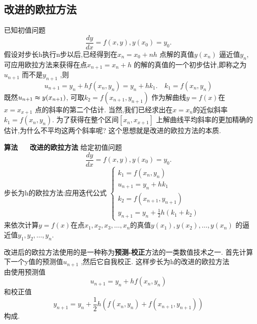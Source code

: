 \documentclass{book}
\begin{document}
\subsection{改进的欧拉方法}
已知初值问题
\begin{equation}
  \frac{dy}{dx}=f(x,y),y(x_0)=y_0.
\end{equation}
假设对步长h执行n步以后,已经得到在$x_n=x_0+nh$ 点解的真值$y(x_n)$ 逼近值$y_n$, 可应用欧拉方法来获得在点$x_{n+1}=x_n+h$ 的解的真值的一个初步估计,即称之为$u_{n+1}$ 而不是$y_{n+1}$ ,则
\begin{equation}
  u_{n+1}=y_n+hf(x_n,y_n)=y_n+hk_1. \quad k_1=f(x_n,y_n)
\end{equation}
既然$u_{n+1}\thickapprox y(x_{n+1})$, 可取$k_2=f(x_{n+1},y_{n+1})$ 作为解曲线$y=f(x)$在$x=x_{x+1}$ 点的斜率的第二个估计. \newline
当然,我们已经求出在$x=x_n$的近似斜率$k_1=f(x_n,y_n)$. 为了获得在整个区间$[x_n,x_{x+1}]$ 上解曲线平均斜率的更加精确的估计,为什么不平均这两个斜率呢? \newline 这个思想就是改进的欧拉方法的本质.
\begin{theorem}
  {\bf 算法~~~改进的欧拉方法} \newline
给定初值问题
\begin{equation}
  \frac{dy}{dx}=f(x,y),y(x_0)=y_0.
\end{equation}
步长为h的欧拉方法:应用迭代公式
$
\begin{cases}
  k_1=f(x_n,y_n) \\
  u_{n+1}=y_n+hk_1 \\
  k_2=f(x_{n+1},y_{n+1}) \\
  y_{n+1}=y_n+\frac{1}{2}h(k_1+k_2)
\end{cases}
$
\\
来依次计算$y=f(x)$在点$x_1,x_2,x_3,\ldots,x_n$的真值$y(x_1),y(x_2),\ldots,y(x_n)$ 的逼近值$y_1,y_2,\ldots,y_n$. 
\end{theorem}
\begin{note}
  改进后的欧拉方法使用的是一种称为{\bf 预测-校正}方法的一类数值技术之一. 首先计算下一个y值的预测值$u_{n+1}$ ,然后它自我校正. 这样步长为h的改进的欧拉方法\\
  由使用预测值
  \begin{equation}
    u_{n+1}=y_n+hf(x_n,y_n)
  \end{equation}
  和校正值
  \begin{equation}
    y_{n+1}=y_n+\frac{1}{2}h(f(x_n,y_n)+f(x_{n+1},y_{n+1}))
  \end{equation}
  构成.
\end{note}
\end{document}
